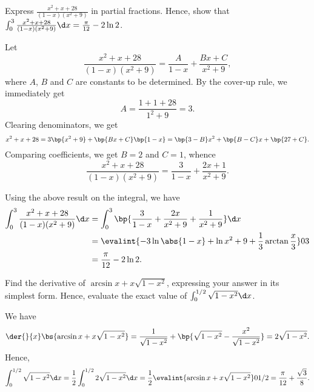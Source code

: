 \begin{problem}
    Express $\frac{x^2 + x + 28}{(1-x)(x^2 + 9)}$ in partial fractions. Hence, show that $\int_0^3 \frac{x^2 + x + 28}{(1 - x)(x^2 + 9)} \d x = \frac\pi{12} - 2 \ln 2$.
\end{problem}
\begin{solution}
    Let \[\frac{x^2 + x + 28}{(1-x)(x^2 + 9)} = \frac{A}{1-x} + \frac{Bx + C}{x^2 + 9},\] where $A$, $B$ and $C$ are constants to be determined. By the cover-up rule, we immediately get \[A = \frac{1 + 1 + 28}{1^2 + 9} = 3.\] Clearing denominators, we get \[x^2 + x + 28 = 3\bp{x^2 + 9} + \bp{Bx + C}\bp{1 - x} = \bp{3 - B} x^2 + \bp{B - C} x + \bp{27 + C}.\] Comparing coefficients, we get $B = 2$ and $C = 1$, whence \[\frac{x^2 + x + 28}{(1-x)(x^2 + 9)} = \frac{3}{1-x} + \frac{2x + 1}{x^2 + 9}.\]

    Using the above result on the integral, we have
    \begin{align*}
        \int_0^3 \frac{x^2 + x + 28}{(1 - x)(x^2 + 9)} \d x &= \int_0^3 \bp{\frac{3}{1-x} + \frac{2x}{x^2 + 9} + \frac1{x^2 + 9}} \d x\\
        &= \evalint{-3\ln \abs{1 - x} + \ln{x^2 + 9} + \frac13 \arctan \frac{x}{3}}03\\
        &= \frac{\pi}{12} - 2 \ln 2.
    \end{align*}
\end{solution}

\begin{problem}
    Find the derivative of $\arcsin x + x\sqrt{1 - x^2}$, expressing your answer in its simplest form. Hence, evaluate the exact value of $\int_0^{1/2} \sqrt{1 - x^2} \d x$.
\end{problem}
\begin{solution}
    We have \[\der{}{x} \bs{\arcsin x + x\sqrt{1 - x^2}} = \frac1{\sqrt{1 - x^2}} + \bp{\sqrt{1 - x^2} - \frac{x^2}{\sqrt{1 - x^2}}} = 2\sqrt{1 - x^2}.\] Hence, \[\int_0^{1/2} \sqrt{1 - x^2} \d x = \frac12 \int_0^{1/2} 2\sqrt{1 - x^2} \d x = \frac12 \evalint{\arcsin x + x\sqrt{1 - x^2}}0{1/2} = \frac{\pi}{12} + \frac{\sqrt{3}}8.\]
\end{solution}